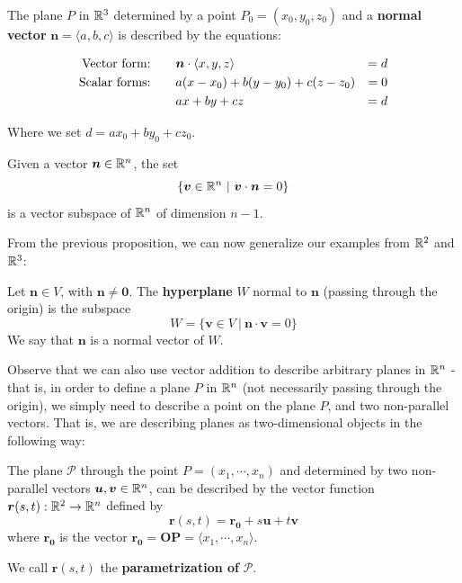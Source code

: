     
    \begin{theorem}
    The plane $P$ in $\mathbb{R}^3$ determined by a point $P_0 = (x_0, y_0, z_0)$ and a \textbf{normal vector} $\bm{n} = \langle a, b, c \rangle$ is described by the equations:
    
    \begin{align*}
        \textnormal{Vector form:} \qquad & \bm{n} \cdot \langle x, y , z \rangle &= d \\
        \textnormal{Scalar forms:} \qquad &  a(x-x_0) + b(y-y_0) + c(z-z_0) &= 0 \\
         & ax + by + cz &= d
    \end{align*}
    
    Where we set $d = ax_0 + by_0 + cz_0$.
    
    \end{theorem}


\begin{proposition}
    Given a vector $\bm{n} \in \mathbb{R}^n$, the set $$\{\bm{v} \in \mathbb{R}^n \ | \ \bm{v} \cdot \bm{n} = 0\}$$ is a vector subspace of $\mathbb{R}^n$ of dimension $n-1$.
\end{proposition}


From the previous proposition, we can now generalize our examples from $\mathbb{R}^2$ and $\mathbb{R}^3$:

\begin{definition}
Let $\bm{n} \in V$, with $\bm{n} \neq \bm{0}$.  The \textbf{hyperplane} $W$ normal to $\bm{n}$ (passing through the origin) is the subspace $$W = \{ \bm{v} \in V \ | \ \bm{n} \cdot \bm{v}  = 0 \}$$
We say that $\bm{n}$ is a normal vector of $W$.
\end{definition}


Observe that we can also use vector addition to describe arbitrary planes in $\mathbb{R}^n$ - that is, in order to define a plane $P$ in $\mathbb{R}^n$ (not necessarily passing through the origin), we simply need to describe a point on the plane $P$, and two non-parallel vectors.  That is, we are describing planes as two-dimensional objects in the following way:

\begin{definition}
    The plane $\mathscr{P}$ through the point $P = (x_1, \cdots, x_n)$  and determined by two non-parallel vectors $\bm{u}, \bm{v} \in \mathbb{R}^n$, can be described by the vector function $\bm{r}(s,t) : \mathbb{R}^2 \to \mathbb{R}^n$ defined by 
    $$\bm{r}(s,t) = \bm{r_0} + s\bm{u} + t\bm{v}$$
    where $\bm{r_0}$ is the vector $\bm{r_0} = \bm{OP} = \langle x_1, \cdots, x_n\rangle$.
    
    We call $\bm{r}(s,t)$ the \textbf{parametrization of} $\mathscr{P}$.
    
    \end{definition}
    
